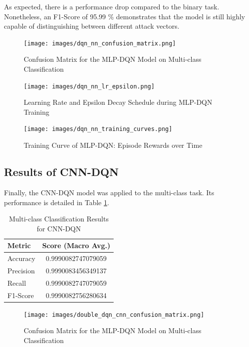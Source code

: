\documentclass[16pt]{report}
\begin{document}
As expected, there is a performance drop compared to the binary task. Nonetheless, an F1-Score of 95.99 \% demonstrates that the model is still highly capable of distinguishing between different attack vectors.
\begin{figure}[H]
    \centering
    \texttt{[image: images/dqn\_nn\_confusion\_matrix.png]}
    \caption{Confusion Matrix for the MLP-DQN Model on Multi-class Classification}
    \label{fig:dqn_conf_matrix}
\end{figure}

\begin{figure}[H]
    \centering
    \texttt{[image: images/dqn\_nn\_lr\_epsilon.png]}
    \caption{Learning Rate and Epsilon Decay Schedule during MLP-DQN Training}
    \label{fig:lr_epsilon}
\end{figure}

\begin{figure}[H]
    \centering
    \texttt{[image: images/dqn\_nn\_training\_curves.png]}
    \caption{Training Curve of MLP-DQN: Episode Rewards over Time}
    \label{fig:training_curve}
\end{figure}

\subsection{Results of CNN-DQN}
Finally, the CNN-DQN model was applied to the multi-class task. Its performance is detailed in Table \ref{tab:multi_cnn_dqn_results}.

\begin{table}[H]
    \centering
    \caption{Multi-class Classification Results for CNN-DQN}
    \label{tab:multi_cnn_dqn_results}
    \begin{tabular}{@{}lc@{}}
        \toprule
        \textbf{Metric} & \textbf{Score (Macro Avg.)} \\
        \midrule
        Accuracy & 0.9990082747079059 \\
        Precision & 0.9990083456349137 \\
        Recall & 0.9990082747079059 \\
        F1-Score & 0.9990082756280634 \\
        \bottomrule
    \end{tabular}
\end{table}

\begin{figure}[H]
    \centering
    \texttt{[image: images/double\_dqn\_cnn\_confusion\_matrix.png]}
    \caption{Confusion Matrix for the MLP-DQN Model on Multi-class Classification}
    \label{fig:ddqn_conf_matrix}
\end{figure}
\end{document}
